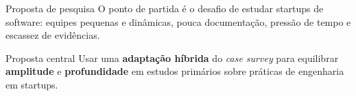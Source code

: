\begin{frame}{Proposta de pesquisa}
\justifying
O ponto de partida é o desafio de estudar startups de software:
equipes pequenas e dinâmicas, pouca documentação,
pressão de tempo e escassez de evidências.

\vspace{0.5em}
\begin{block}{Proposta central}
Usar uma \textbf{adaptação híbrida} do \textit{case survey} para equilibrar \textbf{amplitude} e \textbf{profundidade} em estudos primários sobre práticas de engenharia em startups.\cite{klotins2017case}
\end{block}
\end{frame}